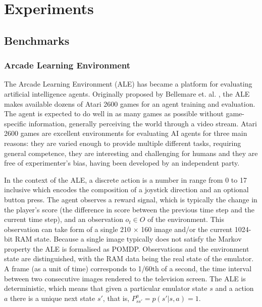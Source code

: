 \section{Experiments}

\subsection{Benchmarks}

\subsubsection{Arcade Learning Environment}


The Arcade Learning Environment (ALE) has became a platform for evaluating artificial intelligence agents. Originally proposed by Bellemare et. al. \cite{Code.ALE}, the ALE makes available dozens of Atari 2600 games for an agent training and evaluation. The agent is expected to do well in as many games as possible without game-specific information, generally perceiving the world through a video stream. Atari 2600 games are excellent environments for evaluating AI agents for three main reasons: they are varied enough to provide multiple different tasks, requiring general competence, they are interesting and challenging for humans and they are free of experimenter’s bias, having been developed by an independent party.

In the context of the ALE, a discrete action is a number in range from 0 to 17 inclusive which encodes the composition of a joystick direction and an optional button press. The agent observes a reward signal, which is typically the change in the player’s score (the difference in score between the previous time step and the current time step), and an observation $o_t \in O$ of the environment. This observation can take form of a single 210 × 160 image and/or the current 1024-bit RAM state. Because a single image typically does not satisfy the Markov property the ALE is formalised as POMDP. Observations and the environment state are distinguished, with the RAM data being the real state of the emulator. A frame (as a unit of time) corresponds to 1/60th of a second, the time interval between two consecutive images rendered to the television screen. The ALE is deterministic, which means that given a particular emulator state $s$ and a action $a$ there is a unique next state $s'$, that is, $P^a_{ss'} = p(s' | s, a) = 1$.

